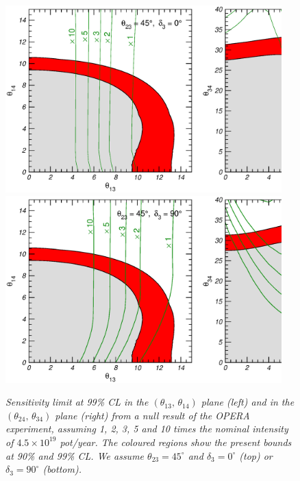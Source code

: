\documentclass[12pt]{elsart}
\begin{document}
\begin{figure}[t] \centering
    \includegraphics[width=0.95\textwidth]{fig.opera-00.eps}
    \includegraphics[width=0.95\textwidth]{fig.opera-90.eps}
    \caption{\label{fig:opera}\sl%
      Sensitivity limit at 99\% CL in the $(\theta_{13},\,
      \theta_{14})$ plane (left) and in the $(\theta_{24},\,
      \theta_{34})$ plane (right) from a null result of the OPERA
      experiment, assuming 1, 2, 3, 5 and 10 times the nominal
      intensity of $4.5 \times 10^{19}$ pot/year. The coloured regions
      show the present bounds at 90\% and 99\% CL. We assume
      $\theta_{23} = 45^\circ$ and $\delta_3 = 0^\circ$ (top) or
      $\delta_3 = 90^\circ$ (bottom).}
\end{figure}
\end{document}
